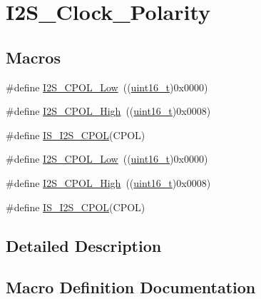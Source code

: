 \hypertarget{group___i2_s___clock___polarity}{}\section{I2\+S\+\_\+\+Clock\+\_\+\+Polarity}
\label{group___i2_s___clock___polarity}
\subsection*{Macros}
\begin{DoxyCompactItemize}
\item 
\#define \hyperlink{group___i2_s___clock___polarity_gae859a63575e4af3e007fc5123fa901ab}{I2\+S\+\_\+\+C\+P\+O\+L\+\_\+\+Low}~((\hyperlink{_p_e___types_8h_a1f1825b69244eb3ad2c7165ddc99c956}{uint16\+\_\+t})0x0000)
\item 
\#define \hyperlink{group___i2_s___clock___polarity_gae26f7f9fbde299fbdc0b81a2cc38bfdb}{I2\+S\+\_\+\+C\+P\+O\+L\+\_\+\+High}~((\hyperlink{_p_e___types_8h_a1f1825b69244eb3ad2c7165ddc99c956}{uint16\+\_\+t})0x0008)
\item 
\#define \hyperlink{group___i2_s___clock___polarity_ga6323375bf0b6fa6e2ee2a9ce6f9ef82f}{I\+S\+\_\+\+I2\+S\+\_\+\+C\+P\+OL}(C\+P\+OL)
\item 
\#define \hyperlink{group___i2_s___clock___polarity_gae859a63575e4af3e007fc5123fa901ab}{I2\+S\+\_\+\+C\+P\+O\+L\+\_\+\+Low}~((\hyperlink{_p_e___types_8h_a1f1825b69244eb3ad2c7165ddc99c956}{uint16\+\_\+t})0x0000)
\item 
\#define \hyperlink{group___i2_s___clock___polarity_gae26f7f9fbde299fbdc0b81a2cc38bfdb}{I2\+S\+\_\+\+C\+P\+O\+L\+\_\+\+High}~((\hyperlink{_p_e___types_8h_a1f1825b69244eb3ad2c7165ddc99c956}{uint16\+\_\+t})0x0008)
\item 
\#define \hyperlink{group___i2_s___clock___polarity_ga6323375bf0b6fa6e2ee2a9ce6f9ef82f}{I\+S\+\_\+\+I2\+S\+\_\+\+C\+P\+OL}(C\+P\+OL)
\end{DoxyCompactItemize}


\subsection{Detailed Description}


\subsection{Macro Definition Documentation}
